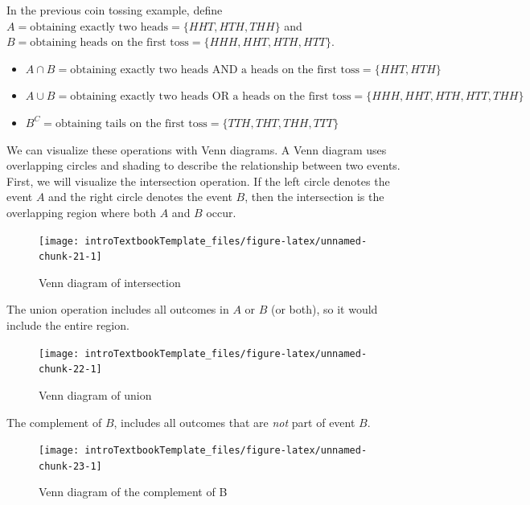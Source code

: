 \documentclass[
]{book}
\providecommand{\tightlist}{%
  \setlength{\itemsep}{0pt}\setlength{\parskip}{0pt}}
\theoremstyle{definition}
\theoremstyle{definition}
\theoremstyle{definition}
\theoremstyle{remark}
\begin{document}
In the previous coin tossing example, define \(A = \text{obtaining exactly two heads} = \{HHT, HTH, THH\}\) and \(B = \text{obtaining heads on the first toss} = \{HHH, HHT, HTH, HTT\}\).

\begin{itemize}
\tightlist
\item
  \(A \cap B = \text{obtaining exactly two heads AND a heads on the first toss} = \{HHT, HTH\}\)
\item
  \(A \cup B = \text{obtaining exactly two heads OR a heads on the first toss}= \{HHH, HHT, HTH, HTT, THH\}\)
\item
  \(B^C = \text{obtaining tails on the first toss} = \{TTH, THT, THH, TTT\}\)
\end{itemize}

We can visualize these operations with Venn diagrams. A Venn diagram uses overlapping circles and shading to describe the relationship between two events. First, we will visualize the intersection operation. If the left circle denotes the event \(A\) and the right circle denotes the event \(B\), then the intersection is the overlapping region where both \(A\) and \(B\) occur.

\begin{figure}

{\centering \texttt{[image: introTextbookTemplate\_files/figure-latex/unnamed-chunk-21-1]} 

}

\caption{Venn diagram of intersection}\label{fig:unnamed-chunk-21}
\end{figure}

The union operation includes all outcomes in \(A\) or \(B\) (or both), so it would include the entire region.

\begin{figure}

{\centering \texttt{[image: introTextbookTemplate\_files/figure-latex/unnamed-chunk-22-1]} 

}

\caption{Venn diagram of union}\label{fig:unnamed-chunk-22}
\end{figure}

The complement of \(B\), includes all outcomes that are \emph{not} part of event \(B\).

\begin{figure}

{\centering \texttt{[image: introTextbookTemplate\_files/figure-latex/unnamed-chunk-23-1]} 

}

\caption{Venn diagram of the complement of B}\label{fig:unnamed-chunk-23}
\end{figure}
\end{document}

